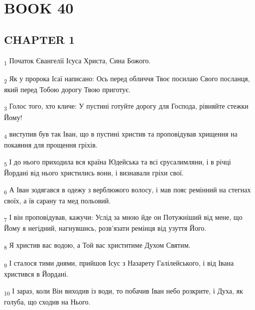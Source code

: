 \section{BOOK 40}
\subsection{CHAPTER 1}
\begin{tcolorbox}
\textsubscript{1} Початок Євангелії Ісуса Христа, Сина Божого.
\end{tcolorbox}
\begin{tcolorbox}
\textsubscript{2} Як у пророка Ісаї написано: Ось перед обличчя Твоє посилаю Свого посланця, який перед Тобою дорогу Твою приготує.
\end{tcolorbox}
\begin{tcolorbox}
\textsubscript{3} Голос того, хто кличе: У пустині готуйте дорогу для Господа, рівняйте стежки Йому!
\end{tcolorbox}
\begin{tcolorbox}
\textsubscript{4} виступив був так Іван, що в пустині христив та проповідував хрищення на покаяння для прощення гріхів.
\end{tcolorbox}
\begin{tcolorbox}
\textsubscript{5} І до нього приходила вся країна Юдейська та всі єрусалимляни, і в річці Йордані від нього христились вони, і визнавали гріхи свої.
\end{tcolorbox}
\begin{tcolorbox}
\textsubscript{6} А Іван зодягався в одежу з верблюжого волосу, і мав пояс ремінний на стегнах своїх, а їв сарану та мед польовий.
\end{tcolorbox}
\begin{tcolorbox}
\textsubscript{7} І він проповідував, кажучи: Услід за мною йде он Потужніший від мене, що Йому я негідний, нагнувшись, розв'язати ремінця від узуття Його.
\end{tcolorbox}
\begin{tcolorbox}
\textsubscript{8} Я христив вас водою, а Той вас христитиме Духом Святим.
\end{tcolorbox}
\begin{tcolorbox}
\textsubscript{9} І сталося тими днями, прийшов Ісус з Назарету Галілейського, і від Івана христився в Йордані.
\end{tcolorbox}
\begin{tcolorbox}
\textsubscript{10} І зараз, коли Він виходив із води, то побачив Іван небо розкрите, і Духа, як голуба, що сходив на Нього.
\end{tcolorbox}

